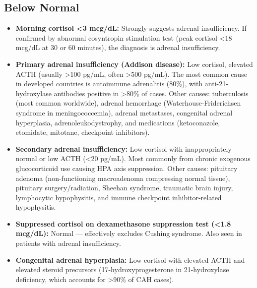 \subsection*{Below Normal}
\begin{itemize}
  \item \textbf{Morning cortisol <3 mcg/dL:} Strongly suggests adrenal insufficiency. If confirmed by abnormal cosyntropin stimulation test (peak cortisol <18 mcg/dL at 30 or 60 minutes), the diagnosis is adrenal insufficiency.
  \item \textbf{Primary adrenal insufficiency (Addison disease):} Low cortisol, elevated ACTH (usually >100 pg/mL, often >500 pg/mL). The most common cause in developed countries is autoimmune adrenalitis (80\%), with anti-21-hydroxylase antibodies positive in >80\% of cases. Other causes: tuberculosis (most common worldwide), adrenal hemorrhage (Waterhouse-Friderichsen syndrome in meningococcemia), adrenal metastases, congenital adrenal hyperplasia, adrenoleukodystrophy, and medications (ketoconazole, etomidate, mitotane, checkpoint inhibitors).
  \item \textbf{Secondary adrenal insufficiency:} Low cortisol with inappropriately normal or low ACTH (<20 pg/mL). Most commonly from chronic exogenous glucocorticoid use causing HPA axis suppression. Other causes: pituitary adenoma (non-functioning macroadenoma compressing normal tissue), pituitary surgery/radiation, Sheehan syndrome, traumatic brain injury, lymphocytic hypophysitis, and immune checkpoint inhibitor-related hypophysitis.
  \item \textbf{Suppressed cortisol on dexamethasone suppression test (<1.8 mcg/dL):} Normal --- effectively excludes Cushing syndrome. Also seen in patients with adrenal insufficiency.
  \item \textbf{Congenital adrenal hyperplasia:} Low cortisol with elevated ACTH and elevated steroid precursors (17-hydroxyprogesterone in 21-hydroxylase deficiency, which accounts for >90\% of CAH cases).
\end{itemize}

